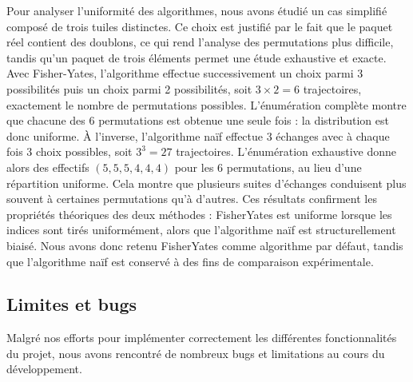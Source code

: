 \documentclass[11pt]{article}
\begin{document}
Pour analyser l'uniformité des algorithmes, nous avons étudié un cas simplifié composé de trois tuiles distinctes.
Ce choix est justifié par le fait que le paquet réel contient des doublons, ce qui rend l'analyse des permutations plus difficile, tandis qu'un paquet de trois éléments permet une étude exhaustive et exacte. 
Avec Fisher-Yates, l'algorithme effectue successivement un choix parmi 3 possibilités puis un choix parmi 2 possibilités, soit $3 \times 2 = 6$ trajectoires, exactement le nombre de permutations possibles. 
L'énumération complète montre que chacune des 6 permutations est obtenue une seule fois : la distribution est donc uniforme. 
À l'inverse, l'algorithme naïf effectue 3 échanges avec à chaque fois 3 choix possibles, soit $3^3 = 27$ trajectoires. 
L'énumération exhaustive donne alors des effectifs $(5,5,5,4,4,4)$ pour les 6 permutations, au lieu d'une répartition uniforme. 
Cela montre que plusieurs suites d'échanges conduisent plus souvent à certaines permutations qu'à d'autres.
Ces résultats confirment les propriétés théoriques des deux méthodes : Fisher\-Yates est uniforme lorsque les indices sont tirés uniformément, alors que l'algorithme naïf est structurellement biaisé. 
Nous avons donc retenu Fisher\-Yates comme algorithme par défaut, tandis que l'algorithme naïf est conservé à des fins de comparaison expérimentale.


\subsection{Limites et bugs}

Malgré nos efforts pour implémenter correctement les différentes fonctionnalités du projet, nous avons rencontré de nombreux bugs et limitations au cours du développement.
\end{document}
